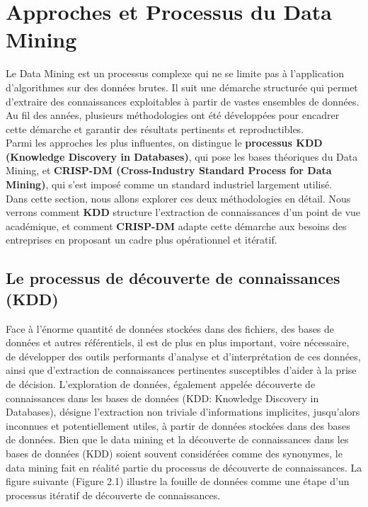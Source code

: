 \documentclass[a4paper,12pt]{report}
\begin{document}
        
\chapter{Approches et Processus du Data Mining}
    Le Data Mining est un processus complexe qui ne se limite pas à l’application d’algorithmes sur des données brutes. Il suit une démarche structurée qui permet d’extraire des connaissances exploitables à partir de vastes ensembles de données. Au fil des années, plusieurs méthodologies ont été développées pour encadrer cette démarche et garantir des résultats pertinents et reproductibles.\\
    Parmi les approches les plus influentes, on distingue le \textbf{processus KDD (Knowledge Discovery in Databases)}, qui pose les bases théoriques du Data Mining, et \textbf{CRISP-DM (Cross-Industry Standard Process for Data Mining)}, qui s’est imposé comme un standard industriel largement utilisé.\\
    Dans cette section, nous allons explorer ces deux méthodologies en détail. Nous verrons comment \textbf{KDD} structure l’extraction de connaissances d’un point de vue académique, et comment \textbf{CRISP-DM} adapte cette démarche aux besoins des entreprises en proposant un cadre plus opérationnel et itératif.

    \section{Le processus de découverte de connaissances (KDD)}
        Face à l'énorme quantité de données stockées dans des fichiers, des bases de données et autres référentiels, il est de plus en plus important, voire nécessaire, de développer des outils performants d'analyse et d'interprétation de ces données, ainsi que d'extraction de connaissances pertinentes susceptibles d'aider à la prise de décision.
        L'exploration de données, également appelée découverte de connaissances dans les bases de données (KDD: Knowledge Discovery in Databases), désigne l'extraction non triviale d'informations implicites, jusqu'alors inconnues et potentiellement utiles, à partir de données stockées dans des bases de données. Bien que le data mining et la découverte de connaissances dans les bases de données (KDD) soient souvent considérées comme des synonymes, le data mining fait en réalité partie du processus de découverte de connaissances. La figure suivante (Figure 2.1) illustre la fouille de données comme une étape d'un processus itératif de découverte de connaissances.\\
        \clearpage
\end{document}
